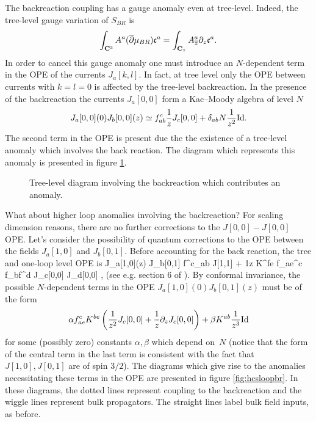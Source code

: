 \documentclass[../main.tex]{subfiles}
\begin{document}
The backreaction coupling has a gauge anomaly even at tree-level.
Indeed, the tree-level gauge variation of $S_{BR}$ is
\[
\int_{\mathbf{C}^3} A^a (\overline{\partial} \mu_{BR}) \mathfrak{c}^a = \int_{\mathbf{C}_z} A_{{\overline{z}}}^a \partial_z \mathfrak{c}^a .
\]
In order to cancel this gauge anomaly one must introduce an $N$-dependent term in the OPE of the currents $J_a[k,l]$. 
In fact, at tree level only the OPE between currents with $k=l=0$ 
is affected by the tree-level backreaction.
In the presence of the backreaction the currents $J_a[0,0]$ form a Kac--Moody algebra of level $N$
\[
J_a[0,0] (0) J_b [0,0] (z) \simeq f_{ab}^c \frac1z J_c[0,0] + \delta_{ab} N \frac1{z^2} {\rm Id} .
\]
The second term in the OPE is present due the the existence of a tree-level anomaly which involves the back reaction.
The diagram which represents this anomaly is presented in figure \ref{fig:hcstreebr}.

\begin{figure}
	\label{fig:hcstreebr}
	\caption{Tree-level diagram involving the backreaction which contributes an anomaly.}  
\end{figure}

What about higher loop anomalies involving the backreaction?
For scaling dimension reasons, there are no further corrections to the $J[0,0]-J[0,0]$ OPE.
Let's consider the possibility of quantum corrections to the OPE between the fields $J_a[1,0]$ and $J_b[0,1]$. 
Before accounting for the back reaction, the tree and one-loop level OPE is 
\beqn\label{eqn:Jbr}
J_a[1,0](z) J_b[0,1] \simeq {} f^c_{ab} J[1,1] + \hbar \frac1z K^{fe} f_{ae}^c f_{bf}^d J_c[0,0] J_d[0,0] ,
\eeqn
(see e.g. section 6 of \cite{CP}).
By conformal invariance, the possible $N$-dependent terms in the OPE $J_a[1,0] (0) J_b [0,1](z)$ must be of the form
\[
\alpha f^c_{ae} K^{be}  \left(\frac{1}{z^2} J_c[0,0] + \frac{1}{z} \partial_z J_c[0,0] \right) + \beta K^{ab} \frac{1}{z^3} {\rm Id} 
\]
for some (possibly zero) constants $\alpha,\beta$ which depend on~$N$
(notice that the form of the central term in the last term is consistent with the fact that $J[1,0], J[0,1]$ are of spin $3/2$).
The diagrams which give rise to the anomalies necessitating these terms in the OPE are presented in figure \ref{fig:hcsloopbr}.
In these diagrams, the dotted lines represent coupling to the backreaction and the wiggle lines represent bulk propagators.
The straight lines label bulk field inputs, as before.
\end{document}
